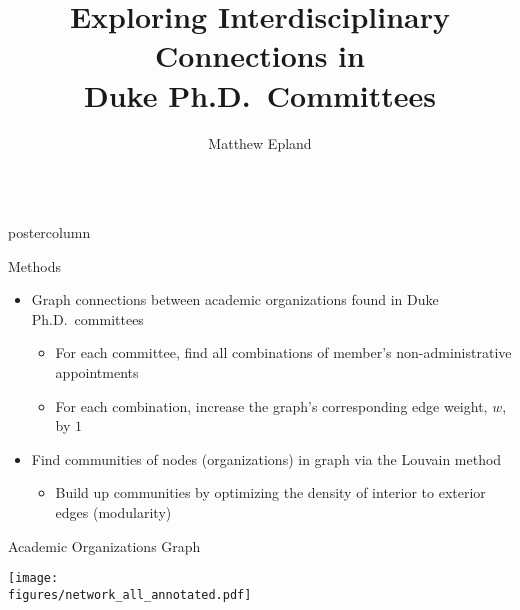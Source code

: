 \documentclass{beamer}
\title{\huge Exploring Interdisciplinary Connections in\\Duke Ph.D.\ Committees}
\author{Matthew Epland}
\institute[Duke]{Duke University}
\newcommand{\figures}{../outputs/plots}
\newlength{\columnheight}
\begin{document}
\begin{frame}
\vspace{2.5cm} %
\begin{columns}
\begin{column}{.57\textwidth}
\begin{beamercolorbox}[center]{postercolumn}
\begin{minipage}{.98\textwidth}  %
\parbox[t][\columnheight]{\textwidth}{ %
  \vfill
  \begin{myblock}{Methods}
    \begin{itemize}
      \item Graph connections between academic organizations found in Duke Ph.D.\ committees
      \begin{itemize}
        \item For each committee, find all combinations of member's non-administrative appointments
        \item For each combination, increase the graph's corresponding edge weight, $w$, by $1$
      \end{itemize}
    \end{itemize}

    \vspace{0.5cm}

    \begin{center}
    \end{center}

    \vspace{0.5cm}

    \begin{itemize}
      \item Find communities of nodes (organizations) in graph via the Louvain method \cite{louvain}
      \begin{itemize}
        \item Build up communities by optimizing the density of interior to exterior edges (modularity)
      \end{itemize}
    \end{itemize}
  \end{myblock}\vfill


  \begin{myblock}{Academic Organizations Graph}
    \vspace{0.8cm}
    \begin{center}
      \texttt{[image: \\figures/network\_all\_annotated.pdf]}
    \end{center}
  \end{myblock}\vfill


}
\end{minipage}
\end{beamercolorbox}
\end{column}
\end{columns}
\end{frame}
\end{document}

